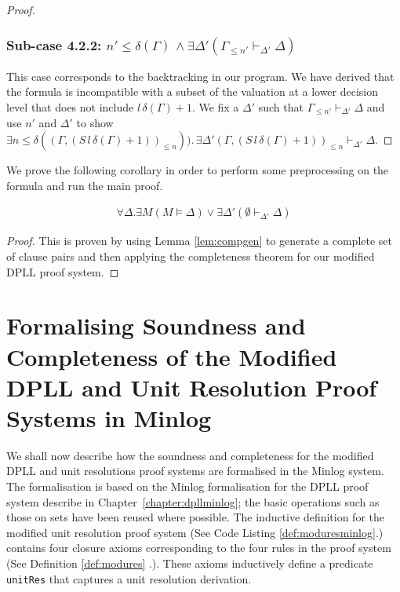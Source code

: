 \begin{mytheorem}
\begin{proof}
\subsubsection*{Sub-case 4.2.2: $ n' \leq \delta(\Gamma) \, \wedge  \exists \Delta' ( \Gamma_{ \leq n'}  \vdash_{\Delta'} \Delta)$} 
This case corresponds to the backtracking in our program. We have derived that the formula is incompatible with a subset of the valuation at a lower decision level that does not include $l \, \delta(\Gamma) + 1$. We fix a $\Delta'$ such that $\Gamma_{\leq n'} \vdash_{\Delta'} \Delta$ and use $n'$ and $\Delta'$ to show $\exists n \leq \delta((\Gamma, ( S \, l \, \delta(\Gamma) + 1))_{\leq n})). \, \exists \Delta' (\Gamma, (S \, l \, \delta(\Gamma) + 1))_{\leq n} \vdash_{\Delta'} \Delta$.
\end{proof}
\end{mytheorem}
%
We prove the following corollary in order to perform some preprocessing on the formula and run the main proof. \\
\medskip
\begin{mycorollary}
\begin{align*}
\forall \Delta. \exists M( M \models \Delta) \vee \exists \Delta'(\emptyset \vdash_{\Delta'} \Delta)
\end{align*}
\begin{proof}
This is proven by using Lemma \ref{lem:compgen} to generate a complete set of clause pairs and then applying the completeness theorem for our modified DPLL proof system.
\end{proof}
\end{mycorollary}

\section{Formalising Soundness and Completeness of the Modified DPLL and Unit Resolution Proof Systems in Minlog}
We shall now describe how the soundness and completeness for the modified DPLL and  unit resolutions proof systems are formalised in the Minlog system. The formalisation is based on the Minlog formalisation for the DPLL proof system describe in Chapter~\ref{chapter:dpllminlog}; the basic operations such as those on sets have been reused where possible. The inductive definition for the modified unit resolution proof system (See Code Listing \ref{def:moduresminlog}.) contains four closure axioms corresponding to the four rules in the proof system (See Definition \ref{def:modures} .). These axioms inductively define a predicate \texttt{unitRes} that captures a unit resolution derivation.


